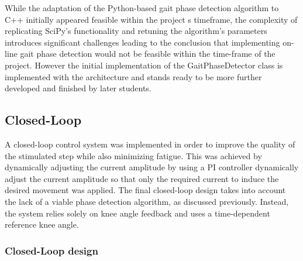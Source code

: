 While the adaptation of the Python-based gait phase detection algorithm to C++ initially appeared feasible within the project
s timeframe, the complexity of replicating SciPy's functionality and retuning the algorithm's parameters introduces significant challenges leading to the conclusion that implementing on-line gait phase detection would not be feasible within the time-frame of the project. However the initial implementation of the GaitPhaseDetector class is implemented with the architecture and stands ready to be more further developed and finished by later students.

\subsection{Closed-Loop}
A closed-loop control system was implemented in order to improve the quality of the stimulated step while also minimizing fatigue. This was achieved by dynamically adjusting the current amplitude by using a  PI controller dynamically adjust the current amplitude so that only the required current to induce the desired movement was applied. The final closed-loop design takes into account the lack of a viable phase detection algorithm, as discussed previously. Instead, the system relies solely on knee angle feedback and uses a time-dependent reference knee angle.

\subsubsection{Closed-Loop design}

